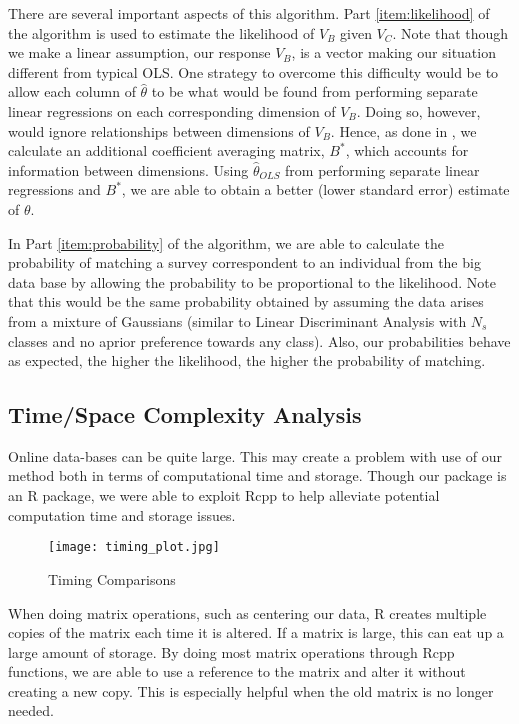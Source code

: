 There are several important aspects of this algorithm. Part \ref{item:likelihood} of the algorithm is used to estimate the likelihood of $V_B$ given $V_C$. Note that though we make a linear assumption, our response $V_B$, is a vector making our situation different from typical OLS.  One strategy to overcome this difficulty would be to allow each column of $\hat\theta$ to be what would be found from performing separate linear regressions on each corresponding dimension of $V_B$.  Doing so, however, would ignore relationships between dimensions of $V_B$. Hence, as done in \cite{RefWorks:97}, we calculate an additional coefficient averaging matrix, $B^*$, which accounts for information between dimensions. Using $\hat\theta_{OLS}$ from performing separate linear regressions and $B^*$, we are able to obtain a better (lower standard error) estimate of $ \theta  $.\

In Part \ref{item:probability} of the algorithm, we are able to calculate the probability of matching a survey correspondent to an individual from the big data base by allowing the probability to be proportional to the likelihood. Note that this would be the same probability obtained by assuming the data arises from a mixture of Gaussians (similar to Linear Discriminant Analysis with $N_s$ classes and no aprior preference towards any class). Also, our probabilities behave as expected, the higher the likelihood, the higher the probability of matching.\

\subsection{Time/Space Complexity Analysis}
Online data-bases can be quite large.  This may create a problem with use of our method both in terms of computational time and storage. Though our package is an R package, we were able to exploit Rcpp to help alleviate potential computation time and storage issues.\


\begin{wrapfigure}{r}{0.5\textwidth}
\texttt{[image: timing\_plot.jpg]}
\caption{\label{fig:timing_plot}Timing Comparisons}
\end{wrapfigure}
When doing matrix operations, such as centering our data, R creates multiple copies of the matrix each time it is altered. If a matrix is large, this can eat up a large amount of storage.  By doing most matrix operations through Rcpp functions, we are able to use a reference to the matrix and alter it without creating a new copy.  This is especially helpful when the old matrix is no longer needed.\

